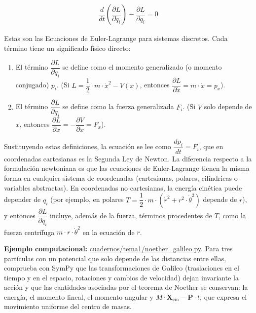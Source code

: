\documentclass[
  spanish,
]{article}
\providecommand{\tightlist}{%
  \setlength{\itemsep}{0pt}\setlength{\parskip}{0pt}}
\begin{document}
\[
\begin{aligned}
\dfrac{d}{dt}\left( \dfrac{\partial L}{\partial \dot{q}_i} \right) - \dfrac{\partial L}{\partial q_i} = 0
\end{aligned}
\]

Estas son las Ecuaciones de Euler-Lagrange para sistemas discretos. Cada
término tiene un significado físico directo:

\begin{enumerate}
\def\labelenumi{\arabic{enumi}.}
\tightlist
\item
  El término \(\dfrac{\partial L}{\partial \dot{q}_i}\) se define como
  el momento generalizado (o momento conjugado) \(p_i\). (Si
  \(L = \dfrac{1}{2} \cdot m \cdot \dot{x}^2 - V(x)\), entonces
  \(\dfrac{\partial L}{\partial \dot{x}} = m \cdot \dot{x} = p_x\)).
\item
  El término \(\dfrac{\partial L}{\partial q_i}\) se define como la
  fuerza generalizada \(F_i\). (Si \(V\) solo depende de \(x\), entonces
  \(\dfrac{\partial L}{\partial x} = -\dfrac{\partial V}{\partial x} = F_x\)).
\end{enumerate}

Sustituyendo estas definiciones, la ecuación se lee como
\(\dfrac{d p_i}{dt} = F_i\), que en coordenadas cartesianas es la
Segunda Ley de Newton. La diferencia respecto a la formulación
newtoniana es que las ecuaciones de Euler-Lagrange tienen la misma forma
en cualquier sistema de coordenadas (cartesianas, polares, cilíndricas o
variables abstractas). En coordenadas no cartesianas, la energía
cinética puede depender de \(q_i\) (por ejemplo, en polares
\(T = \dfrac{1}{2} \cdot m \cdot (\dot{r}^2 + r^2 \cdot \dot{\theta}^2)\)
depende de \(r\)), y entonces \(\dfrac{\partial L}{\partial q_i}\)
incluye, además de la fuerza, términos procedentes de \(T\), como la
fuerza centrífuga \(m \cdot r \cdot \dot{\theta}^2\) en la ecuación de
\(r\).

\textbf{Ejemplo computacional:}
\href{https://github.com/julian1c2a/MCC/blob/main/cuadernos/tema1/noether_galileo.py}{cuadernos/tema1/noether\_galileo.py}.
Para tres partículas con un potencial que solo depende de las distancias
entre ellas, comprueba con SymPy que las transformaciones de Galileo
(traslaciones en el tiempo y en el espacio, rotaciones y cambios de
velocidad) dejan invariante la acción y que las cantidades asociadas por
el teorema de Noether se conservan: la energía, el momento lineal, el
momento angular y
\(M \cdot \mathbf{X}_{\mathrm{cm}} - \mathbf{P} \cdot t\), que expresa
el movimiento uniforme del centro de masas.
\end{document}

